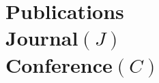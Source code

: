 \vspace{-2.5em}
\section{Publications\\ Journal$(J)$\\Conference$(C)$}
\vspace{-1em}

\vspace{-3em}
\sectionline